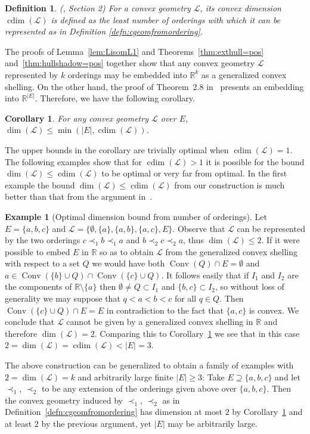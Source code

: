 \documentclass[12pt]{elsarticle}
\theoremstyle{plain}
\newtheorem{corollary}{Corollary}
\newtheorem{definition}{Definition}
\theoremstyle{definition}
\newtheorem{example}{Example}
\newcommand{\cgeom}{\mathcal{L}}
\DeclareMathOperator{\Hull}{Conv}
\DeclareMathOperator{\cdim}{cdim}
\begin{document}
\begin{definition}
(\citet*{ES}, Section 2) For a convex geometry $\cgeom$, its convex dimension  $\cdim(\cgeom)$ is defined as the least number of orderings with which it can be represented as in Definition \ref{defn:cgeomfromordering}.
\end{definition}

The proofs of Lemma~\ref{lem:LisomL1} and Theorems~\ref{thm:exthull=pos} and~\ref{thm:hullshadow=pos}  together show that any convex geometry $\cgeom$ represented by $k$ orderings may be embedded into $\mathbb{R}^{k}$ as a generalized convex shelling. On the other hand, the proof of Theorem~2.8 in~\cite{KNO} presents an embedding into $\mathbb{R}^{|E|}$. Therefore, we have the following corollary.

\begin{corollary}\label{cor:dimbound} For any convex geometry $\cgeom$ over $E$, $\dim(\cgeom) \leq \min(|E|,\cdim(\cgeom))$.
\end{corollary}

The upper bounds in the corollary are trivially optimal when $\cdim(\cgeom)=1$. The following examples show that for $\cdim(\cgeom)>1$ it is possible for the bound $\dim(\cgeom) \leq \cdim(\cgeom)$ to be optimal  or very far from optimal.  In the first example the bound $\dim(\cgeom) \leq \cdim(\cgeom)$ from our construction is much better than that from the argument in~\cite{KNO}.

\begin{example}[Optimal dimension bound from number of orderings]
Let $E=\{a,b,c\}$ and $\cgeom=\{\emptyset,\{a\},\{a,b\},\{a,c\},E\}$. Observe that $\cgeom$ can be represented by the two orderings $c \prec_{1} b \prec_{1} a$ and $b \prec_{2} c \prec_{2} a$, thus $\dim(\cgeom)\leq2$.  If it were possible to embed $E$  in $\mathbb{R}$ so as to obtain $\cgeom$ from the generalized convex shelling with respect to a set $Q$ we would have both $\Hull(Q)\cap E=\emptyset$ and $a\in\Hull(\{b\}\cup Q)\cap\Hull(\{c\}\cup Q)$.  It follows easily that if $I_{1}$ and $I_{2}$ are the components of $\mathbb{R}\setminus\{a\}$ then $\emptyset\neq Q\subset I_{1}$ and $\{b,c\}\subset I_{2}$, so without loss of generality we may suppose that $q<a<b<c$ for all $q\in Q$.  Then $\Hull(\{c\}\cup Q)\cap E=E$ in contradiction to the fact that $\{a,c\}$ is convex.  We conclude that $\cgeom$ cannot be given by a generalized convex shelling in $\mathbb{R}$ and therefore $\dim(\cgeom)=2$.  Comparing this to Corollary~\ref{cor:dimbound} we see that in this case $2=\dim(\cgeom)=\cdim(\cgeom)<|E|=3$.

The above construction can be generalized to obtain a family of examples with $2=\dim(\cgeom)=k$ and arbitrarily large finite $|E|\geq3$: Take  $E \supseteq \{a,b, c\}$ and let $\prec_1$, $\prec_2$ to be any extension of the orderings given above over $\{a,b,c\}$. Then the convex geometry induced by $\prec_1$, $\prec_2$ as in Definition~\ref{defn:cgeomfromordering} has dimension at most $2$ by Corollary~\ref{cor:dimbound} and at least $2$ by the previous argument, yet $|E|$ may be arbitrarily large.
\end{example}
\end{document}
